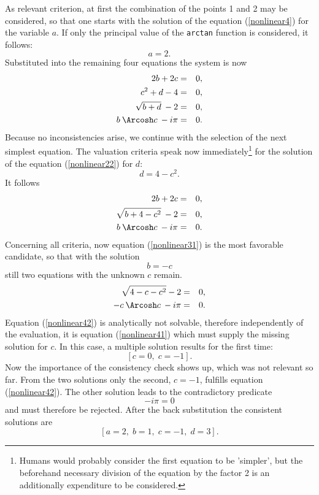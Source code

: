 As relevant criterion, at first the combination of the points 1 and 2 may be considered, so that one starts with the solution of the equation (\ref{nonlinear4}) for the variable $a$. If only the principal value of the {\tt arctan} function is considered,  it follows:
\begin{equation}
a = 2.
\end{equation}
Substituted into the remaining four equations the system is now
\begin{eqnarray}
                  2b + 2c &=& 0,  \label{nonlinear21} \\
             c^2 + d -  4 &=& 0,  \label{nonlinear22} \\
     \sqrt{b + d} \: -  2 &=& 0,  \\
b \: \Arcosh c \: - i \pi &=& 0.  \label{nonlinear24}
\end{eqnarray}
 Because no inconsistencies arise, we continue with the selection of the next simplest equation. The valuation criteria speak now immediately\footnote{Humans would probably consider the first equation to be  'simpler', but the beforehand necessary division of the equation by the factor 2 is an additionally expenditure to be considered.} for the solution of the equation (\ref{nonlinear22}) for $d$:
\begin{equation}
d = 4 - c^2.
\end{equation}
It follows
\begin{eqnarray}
                         2b + 2c &=& 0,  \label{nonlinear31} \\
  \sqrt{b + 4 - c^2} \: -  2 &=& 0,  \\
     b \: \Arcosh c \: - i \pi &=& 0.  \label{nonlinear33}
\end{eqnarray}
Concerning all criteria, now  equation  (\ref{nonlinear31}) is  the  most favorable candidate, so that with the solution
\begin{equation}
b = -c
\end{equation}
still two equations with the unknown  $c$  remain.
\begin{eqnarray}
    \sqrt{4 - c - c^2} -  2 &=& 0,  \label{nonlinear41} \\
 -c \: \Arcosh c \: - i \pi &=& 0.  \label{nonlinear42}
\end{eqnarray}
Equation  (\ref{nonlinear42}) is analytically not solvable, therefore independently of the evaluation, it is equation (\ref{nonlinear41}) which must supply the missing solution for  $c$. In this case, a multiple solution results for the first time:
\begin{equation}
\left[ c = 0, \; c = -1 \right].
\end{equation}
Now the importance  of the consistency check shows up, which was not relevant so far. From the two solutions only the second, $c=-1$, fulfills equation (\ref{nonlinear42}). The other solution leads to the contradictory predicate
\begin{equation}
- i \pi = 0
\end{equation}
and must therefore be rejected. After the back substitution the consistent solutions are
\begin{equation}
\left[ a = 2, \; b = 1, \; c = -1, \; d = 3 \right].
\end{equation}

